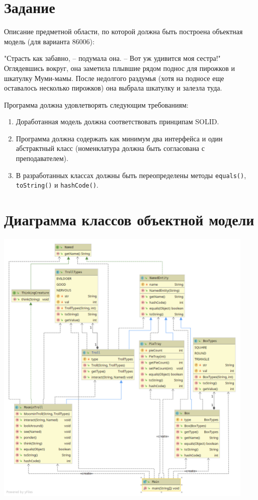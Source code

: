 \documentclass[11pt]{article}
\begin{document}
\section{Задание}
Описание предметной области, по которой должна быть построена объектная модель (для варианта 86006):
\begin{displayquote}
	"Страсть как забавно, -- подумала она. -- Вот уж удивится моя сестра!" Оглядевшись вокруг, она заметила плывшие рядом поднос для пирожков и шкатулку Муми-мамы. После недолгого раздумья (хотя на подносе еще оставалось несколько пирожков) она выбрала шкатулку и залезла туда.
\end{displayquote}
Программа должна удовлетворять следующим требованиям:
\begin{enumerate}
	\item Доработанная модель должна соответствовать принципам SOLID.
	\item Программа должна содержать как минимум два интерфейса и один абстрактный класс (номенклатура должна быть согласована с преподавателем).
	\item В разработанных классах должны быть переопределены методы \texttt{equals()},\texttt{ toString()} и \texttt{hashCode()}.
\pagebreak
\end{enumerate}
\section{Диаграмма классов объектной модели}
\includegraphics[width=470px]{../Package prog3lab.png}
\pagebreak
\end{document}
